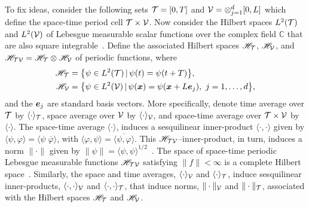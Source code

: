 \documentclass[amsa]{ipart}
\begin{document}
To fix ideas, consider the following sets $\mathcal{T}=[0,T]$ and 
$\mathcal{V}=\otimes_{j=1}^d[0,L]$ which  define the space-time period cell
$\mathcal{T}\times\mathcal{V}$. Now consider the Hilbert spaces
$L^2(\mathcal{T})$ and $L^2(\mathcal{V})$ of Lebesgue measurable scalar functions over
the complex field $\mathbb{C}$ that are also square
integrable~\cite{Folland:99:RealAnalysis}. Define the associated
Hilbert spaces $\mathscr{H}_{\mathcal{T}}$, $\mathscr{H}_{\mathcal{V}}$, and
$\mathscr{H}_{\mathcal{T}\mathcal{V}}=\mathscr{H}_{\mathcal{T}}\otimes\mathscr{H}_{\mathcal{V}}$ of periodic functions, where  
%
\begin{align}\label{eq:Hilbert_Spaces_scalar}  
  \Hs_{\Tc}&=\big\{\psi\in L^2(\Tc) \, | \, \psi(t)=\psi(t+T)\big\},
  \\
  \Hs_{\Vc}&
  =\big\{\psi\in L^2(\Vc) \, | \, \psi(\vecx)=\psi(\vecx+L\vece_j), \ j=1,\ldots,d\big\},
  \notag
\end{align}
%
and the $\boldsymbol{e}_j$ are standard basis
vectors. More specifically, denote time average over $\mathcal{T}$ by
$\langle\cdot\rangle_{\mathcal{T}}$, space average over $\mathcal{V}$ by $\langle\cdot\rangle_{\mathcal{V}}$, and space-time
average over $\mathcal{T}\times\mathcal{V}$ by $\langle\cdot\rangle$. The space-time average $\langle\cdot\rangle$,
induces a sesquilinear inner-product $\langle\cdot,\cdot\rangle$ given by
$\langle\psi,\varphi\rangle=\langle\psi\;\overline{\varphi}\rangle$, with $\langle\varphi,\psi\rangle=\overline{\langle\psi,\varphi\rangle}$. This
$\mathscr{H}_{\mathcal{T}\mathcal{V}}$--inner-product, in turn, induces a norm $\|\cdot\|$ given by
$\|\psi\|=\langle\psi,\psi\rangle^{1/2}$~\cite{Folland:99:RealAnalysis}. The space of
space-time periodic
Lebesgue measurable functions $\mathscr{H}_{\mathcal{T}\mathcal{V}}$ satisfying $\|f\|<\infty$ is a
complete Hilbert space~\cite{Folland:99:RealAnalysis}. Similarly, the
space and time averages, 
$\langle\cdot\rangle_{\mathcal{V}}$ and $\langle\cdot\rangle_{\mathcal{T}}$, induce sesquilinear inner-products,
$\langle\cdot,\cdot\rangle_{\mathcal{V}}$ and $\langle\cdot,\cdot\rangle_{\mathcal{T}}$, that induce norms, $\|\cdot\|_{\mathcal{V}}$ and
$\|\cdot\|_{\mathcal{T}}$, associated with the Hilbert spaces $\mathscr{H}_{\mathcal{T}}$
and $\mathscr{H}_{\mathcal{V}}$. 
\end{document}
